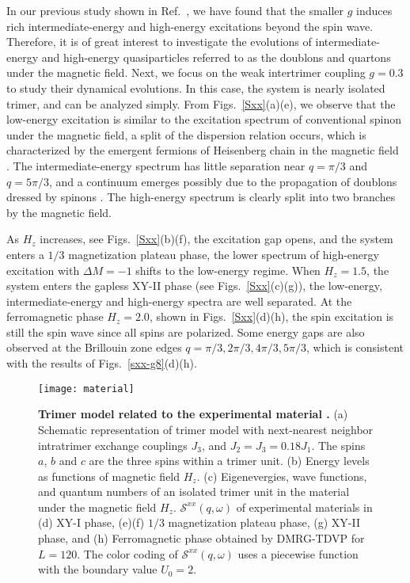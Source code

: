 \documentclass[aps,prx,showpacs,floatfix,twocolumn,superscriptaddress,nofootinbib,longbibliography]{revtex4-2}
\begin{document}
In our previous study shown in Ref.~\cite{cheng2022}, we have found that the smaller $g$ induces  rich intermediate-energy and high-energy  excitations beyond the spin wave. Therefore, it is of great interest  to investigate the evolutions of intermediate-energy  and high-energy quasiparticles referred  to as the doublons and quartons under the magnetic field. Next, we focus on the weak intertrimer coupling  $g=0.3$  to study their dynamical evolutions. 
In this case,  the system is nearly isolated trimer, and  can be analyzed simply. From Figs.~\ref{Sxx}(a)(e), we observe that the low-energy excitation is similar to the excitation spectrum of conventional spinon under the magnetic field, a  split of the dispersion relation occurs, which is characterized by the emergent fermions of Heisenberg chain in the magnetic field \cite{PhysRevB.94.125130}. The intermediate-energy spectrum has little separation near $q=\pi/3$ and $q=5\pi/3$, and a continuum emerges possibly due to the propagation of doublons dressed by spinons \cite{cheng2022}. The high-energy spectrum is clearly split  into two branches by the magnetic field.





As $H_z $ increases, see Figs.~\ref{Sxx}(b)(f), the excitation gap  opens, and the system enters a $1/3 $ magnetization  plateau phase,  the lower   spectrum of high-energy excitation with $\Delta M=-1$ shifts to the low-energy regime. When $H_z =1.5$, the system enters the gapless XY-II phase (see Figs.~\ref{Sxx}(c)(g)), the low-energy, intermediate-energy and high-energy spectra are well separated. At the ferromagnetic phase $H_z=2.0$, shown in
Figs.~\ref{Sxx}(d)(h),    the spin excitation is still the spin wave since all spins are polarized.  Some energy gaps are also observed  at the   Brillouin zone  edges $q=\pi/3,2\pi/3,4\pi/3,5\pi/3 $, which is consistent with the results of Figs.~\ref{sxx-g8}(d)(h).





\begin{figure*}[t]
	\texttt{[image: material]}
	\caption{\textbf{Trimer model related to the experimental material .} (a) Schematic representation of trimer model with next-nearest neighbor intratrimer exchange couplings $J_3$, and $J_2=J_3=0.18J_1$. The spins $a$, $b$ and $c$ are the three  spins within a trimer unit. (b) Energy levels as functions of magnetic field $H_z$.
	(c) Eigenevergies, wave functions, and quantum numbers of an isolated trimer unit in the material under the magnetic field $H_z$. $\mathcal{S}^{xx}  (q,\omega) $ of experimental materials  in  (d) XY-I phase, (e)(f) $1/3 $ magnetization  plateau phase, (g) XY-II phase, and (h) Ferromagnetic phase obtained by  DMRG-TDVP for $L=120$. The  color coding of $\mathcal{S}^{xx} (q,\omega)$ uses a piecewise function with  the boundary value $U_0=2$.}
	\label{material}
	\end{figure*}
\end{document}
